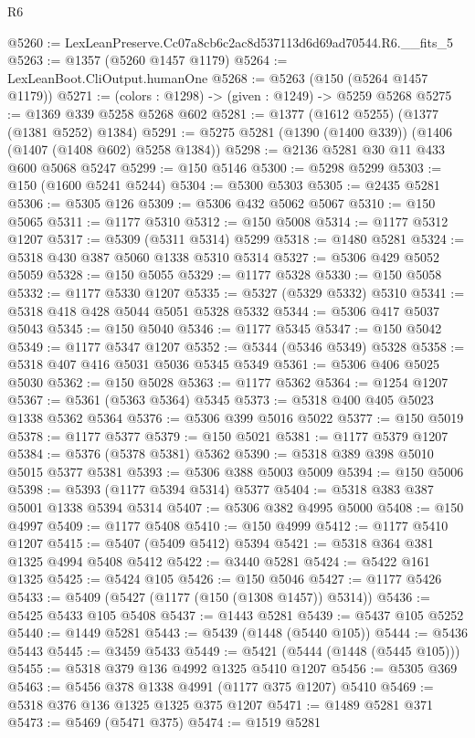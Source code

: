 \begin{lexlean}{R6}
\begin{coremodule}
@5260 := LexLeanPreserve.Cc07a8cb6c2ac8d537113d6d69ad70544.R6.__fits_5
@5263 := @1357 (@5260 @1457 @1179)
@5264 := LexLeanBoot.CliOutput.humanOne
@5268 := @5263 (@150 (@5264 @1457 @1179))
@5271 := (colors : @1298) -> (given : @1249) -> @5259 @5268
@5275 := @1369 @339 @5258 @5268 @602
@5281 := @1377 (@1612 @5255) (@1377 (@1381 @5252) @1384)
@5291 := @5275 @5281 (@1390 (@1400 @339)) (@1406 (@1407 (@1408 @602) @5258 @1384))
@5298 := @2136 @5281 @30 @11 @433 @600 @5068 @5247
@5299 := @150 @5146
@5300 := @5298 @5299
@5303 := @150 (@1600 @5241 @5244)
@5304 := @5300 @5303
@5305 := @2435 @5281
@5306 := @5305 @126
@5309 := @5306 @432 @5062 @5067
@5310 := @150 @5065
@5311 := @1177 @5310
@5312 := @150 @5008
@5314 := @1177 @5312 @1207
@5317 := @5309 (@5311 @5314) @5299
@5318 := @1480 @5281
@5324 := @5318 @430 @387 @5060 @1338 @5310 @5314
@5327 := @5306 @429 @5052 @5059
@5328 := @150 @5055
@5329 := @1177 @5328
@5330 := @150 @5058
@5332 := @1177 @5330 @1207
@5335 := @5327 (@5329 @5332) @5310
@5341 := @5318 @418 @428 @5044 @5051 @5328 @5332
@5344 := @5306 @417 @5037 @5043
@5345 := @150 @5040
@5346 := @1177 @5345
@5347 := @150 @5042
@5349 := @1177 @5347 @1207
@5352 := @5344 (@5346 @5349) @5328
@5358 := @5318 @407 @416 @5031 @5036 @5345 @5349
@5361 := @5306 @406 @5025 @5030
@5362 := @150 @5028
@5363 := @1177 @5362
@5364 := @1254 @1207
@5367 := @5361 (@5363 @5364) @5345
@5373 := @5318 @400 @405 @5023 @1338 @5362 @5364
@5376 := @5306 @399 @5016 @5022
@5377 := @150 @5019
@5378 := @1177 @5377
@5379 := @150 @5021
@5381 := @1177 @5379 @1207
@5384 := @5376 (@5378 @5381) @5362
@5390 := @5318 @389 @398 @5010 @5015 @5377 @5381
@5393 := @5306 @388 @5003 @5009
@5394 := @150 @5006
@5398 := @5393 (@1177 @5394 @5314) @5377
@5404 := @5318 @383 @387 @5001 @1338 @5394 @5314
@5407 := @5306 @382 @4995 @5000
@5408 := @150 @4997
@5409 := @1177 @5408
@5410 := @150 @4999
@5412 := @1177 @5410 @1207
@5415 := @5407 (@5409 @5412) @5394
@5421 := @5318 @364 @381 @1325 @4994 @5408 @5412
@5422 := @3440 @5281
@5424 := @5422 @161 @1325
@5425 := @5424 @105
@5426 := @150 @5046
@5427 := @1177 @5426
@5433 := @5409 (@5427 (@1177 (@150 (@1308 @1457)) @5314))
@5436 := @5425 @5433 @105 @5408
@5437 := @1443 @5281
@5439 := @5437 @105 @5252
@5440 := @1449 @5281
@5443 := @5439 (@1448 (@5440 @105))
@5444 := @5436 @5443
@5445 := @3459 @5433
@5449 := @5421 (@5444 (@1448 (@5445 @105)))
@5455 := @5318 @379 @136 @4992 @1325 @5410 @1207
@5456 := @5305 @369
@5463 := @5456 @378 @1338 @4991 (@1177 @375 @1207) @5410
@5469 := @5318 @376 @136 @1325 @1325 @375 @1207
@5471 := @1489 @5281 @371
@5473 := @5469 (@5471 @375)
@5474 := @1519 @5281

\end{coremodule}
\end{lexlean}
